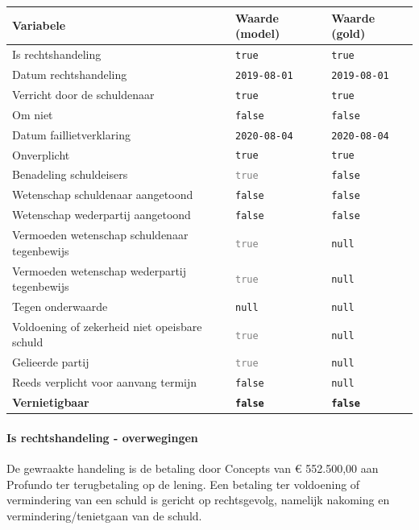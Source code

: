 \documentclass[
  dutch,
  a4paper,
]{article}
\begin{document}
\begin{center}
\small
\begin{tabular}{@{}p{7.4cm}p{2.6cm}p{2.6cm}@{}}
\toprule
Variabele & Waarde (model) & Waarde (gold) \\
\midrule
Is rechtshandeling & \texttt{true} & \texttt{true} \\
Datum rechtshandeling & \texttt{2019-08-01} & \texttt{2019-08-01} \\
Verricht door de schuldenaar & \texttt{true} & \texttt{true} \\
Om niet & \texttt{false} & \texttt{false} \\
Datum faillietverklaring & \texttt{2020-08-04} & \texttt{2020-08-04} \\
Onverplicht & \texttt{true} & \texttt{true} \\
Benadeling schuldeisers & \textcolor{gray}{\texttt{true}} & \texttt{false} \\
Wetenschap schuldenaar aangetoond & \texttt{false} & \texttt{false} \\
Wetenschap wederpartij aangetoond & \texttt{false} & \texttt{false} \\
Vermoeden wetenschap schuldenaar tegenbewijs & \textcolor{gray}{\texttt{true}} & \texttt{null} \\
Vermoeden wetenschap wederpartij tegenbewijs & \textcolor{gray}{\texttt{true}} & \texttt{null} \\
Tegen onderwaarde & \texttt{null} & \texttt{null} \\
Voldoening of zekerheid niet opeisbare schuld & \textcolor{gray}{\texttt{true}} & \texttt{null} \\
Gelieerde partij & \textcolor{gray}{\texttt{true}} & \texttt{null} \\
Reeds verplicht voor aanvang termijn & \texttt{false} & \texttt{null} \\
\textbf{Vernietigbaar} & \textbf{\texttt{false}} & \textbf{\texttt{false}} \\
\bottomrule
\end{tabular}
\end{center}

\paragraph{Is rechtshandeling - overwegingen}\label{is-rechtshandeling---overwegingen-40}

De gewraakte handeling is de betaling door Concepts van € 552.500,00 aan Profundo ter terugbetaling op de lening. Een betaling ter voldoening of vermindering van een schuld is gericht op rechtsgevolg, namelijk nakoming en vermindering/tenietgaan van de schuld.
\end{document}
